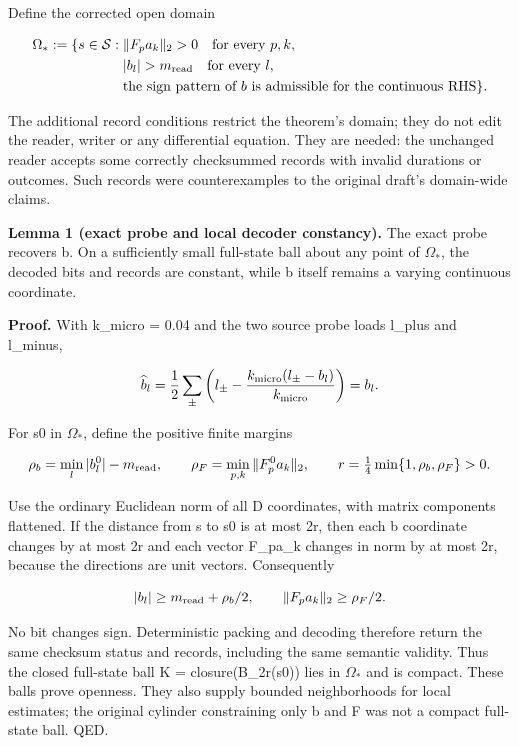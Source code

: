 \documentclass[11pt,a4paper]{article}
\begin{document}
Define the corrected open domain



\[
\begin{aligned}
\Omega_*:=\{s\in\mathcal S:\;&\|F_pa_k\|_2>0\quad\text{for every }p,k,\\
&|b_l|>m_{\rm read}\quad\text{for every }l,\\
&\text{the sign pattern of }b\text{ is admissible for the continuous RHS}\}.
\end{aligned}
\]



The additional record conditions restrict the theorem's domain; they do not edit the reader, writer or any differential equation. They are needed: the unchanged reader accepts some correctly checksummed records with invalid durations or outcomes. Such records were counterexamples to the original draft's domain-wide claims.

\textbf{Lemma 1 (exact probe and local decoder constancy).} The exact probe recovers b. On a sufficiently small full-state ball about any point of \(\Omega_*\), the decoded bits and records are constant, while b itself remains a varying continuous coordinate.

\textbf{Proof.} With k\_micro = 0.04 and the two source probe loads l\_plus and l\_minus,



\[
\widehat b_l
=\frac12\sum_{\pm}\left(l_{\pm}-\frac{k_{\rm micro}(l_{\pm}-b_l)}{k_{\rm micro}}\right)
=b_l.
\]



For s0 in \(\Omega_*\), define the positive finite margins



\[
\rho_b=\min_l|b_l^0|-m_{\rm read},\qquad
\rho_F=\min_{p,k}\|F_p^0a_k\|_2,
\qquad r=\tfrac14\min\{1,\rho_b,\rho_F\}>0.
\]



Use the ordinary Euclidean norm of all D coordinates, with matrix components flattened. If the distance from s to s0 is at most 2r, then each b coordinate changes by at most 2r and each vector F\_pa\_k changes in norm by at most 2r, because the directions are unit vectors. Consequently



\[
|b_l|\ge m_{\rm read}+\rho_b/2,\qquad
\|F_pa_k\|_2\ge\rho_F/2.
\]



No bit changes sign. Deterministic packing and decoding therefore return the same checksum status and records, including the same semantic validity. Thus the closed full-state ball K = closure(B\_2r(s0)) lies in \(\Omega_*\) and is compact. These balls prove openness. They also supply bounded neighborhoods for local estimates; the original cylinder constraining only b and F was not a compact full-state ball. QED.
\end{document}
